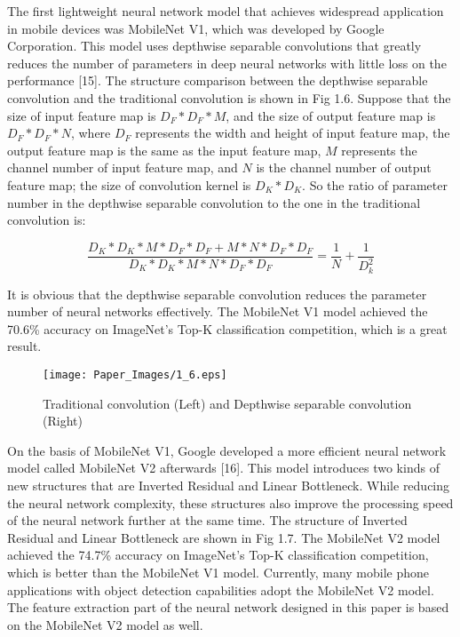\documentclass[22pt, UTF8]{article}
\numberwithin{figure}{section}
\numberwithin{table}{section}
\numberwithin{equation}{section} %
\begin{document}
\setlength\parindent{2em} The first lightweight neural network model that achieves widespread application in mobile devices was MobileNet V1, which was developed by Google Corporation. This model uses depthwise separable convolutions that greatly reduces the number of parameters in deep neural networks with little loss on the performance [15]. The structure comparison between the depthwise separable convolution and the traditional convolution is shown in Fig 1.6. Suppose that the size of input feature map is $D_{F} * D_{F} * M$, and the size of output feature map is $D_{F} * D_{F} * N$, where $D_{F}$ represents the width and height of input feature map, the output feature map is the same as the input feature map, $M$ represents the channel number of input feature map, and $N$ is the channel number of output feature map; the size of convolution kernel is $D_{K} * D_{K}$. So the ratio of parameter number in the depthwise separable convolution to the one in the traditional convolution is:

\vspace{-2mm} %
\begin{equation} %
\frac{D_K * D_K * M * D_F * D_F + M * N * D_F * D_F}{D_K * D_K * M * N * D_F * D_F} = \frac{1}{N} + \frac{1}{D_{k}^{2}}
\end{equation}

\vspace{2mm} %

\setlength\parindent{2em} It is obvious that the depthwise separable convolution reduces the parameter number of neural networks effectively. The MobileNet V1 model achieved the 70.6\% accuracy on ImageNet's Top-K classification competition, which is a great result.

\begin{figure}[htbp]
    \begin{center}
        \texttt{[image: Paper\_Images/1\_6.eps]}
    \end{center}
    \vspace{-3mm} %
    \caption{Traditional convolution (Left) and Depthwise separable convolution (Right)}
    \vspace{-2mm} %
\end{figure}

\setlength\parindent{2em} On the basis of MobileNet V1, Google developed a more efficient neural network model called MobileNet V2 afterwards [16]. This model introduces two kinds of new structures that are Inverted Residual and Linear Bottleneck. While reducing the neural network complexity, these structures also improve the processing speed of the neural network further at the same time. The structure of Inverted Residual and Linear Bottleneck are shown in Fig 1.7. The MobileNet V2 model achieved the 74.7\% accuracy on ImageNet's Top-K classification competition, which is better than the MobileNet V1 model. Currently, many mobile phone applications with object detection capabilities adopt the MobileNet V2 model. The feature extraction part of the neural network designed in this paper is based on the MobileNet V2 model as well.
\end{document}
